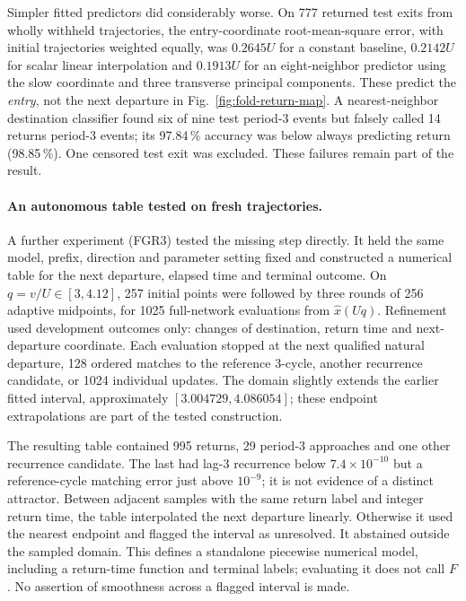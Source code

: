 \documentclass[11pt,letterpaper]{article}
\begin{document}
Simpler fitted predictors did considerably worse. On 777 returned test exits from wholly withheld trajectories,
the entry-coordinate root-mean-square error, with initial trajectories weighted equally, was $0.2645U$ for a
constant baseline, $0.2142U$ for scalar linear interpolation and $0.1913U$ for an eight-neighbor predictor using the
slow coordinate and three transverse principal components. These predict the \emph{entry}, not the next departure
in Fig.~\ref{fig:fold-return-map}. A nearest-neighbor destination classifier found six of nine test period-3 events
but falsely called 14 returns period-3 events; its 97.84\,\% accuracy was below always predicting return
(98.85\,\%). One censored test exit was excluded. These failures remain part of the result.

\paragraph{An autonomous table tested on fresh trajectories.}
A further experiment (FGR3) tested the missing step directly. It held the same model, prefix, direction and
parameter setting fixed and constructed a numerical table for the next departure, elapsed time and terminal
outcome. On $q=v/U\in[3,4.12]$, 257 initial points were followed by three rounds of 256 adaptive midpoints,
for 1025 full-network evaluations from $\widehat x(Uq)$. Refinement used development outcomes only: changes
of destination, return time and next-departure coordinate. Each evaluation stopped at the next qualified
natural departure, 128 ordered matches to the reference 3-cycle, another recurrence candidate, or 1024
individual updates. The domain slightly extends the earlier fitted interval, approximately
$[3.004729,4.086054]$; these endpoint extrapolations are part of the tested construction.

The resulting table contained 995 returns, 29 period-3 approaches and one other recurrence candidate. The
last had lag-3 recurrence below $7.4\times10^{-10}$ but a reference-cycle matching error just above $10^{-9}$;
it is not evidence of a distinct attractor. Between adjacent samples with the same return label and integer
return time, the table interpolated the next departure linearly. Otherwise it used the nearest endpoint and
flagged the interval as unresolved. It abstained outside the sampled domain. This defines a standalone
piecewise numerical model, including a return-time function and terminal labels; evaluating it does not call
$F$. No assertion of smoothness across a flagged interval is made.
\end{document}
